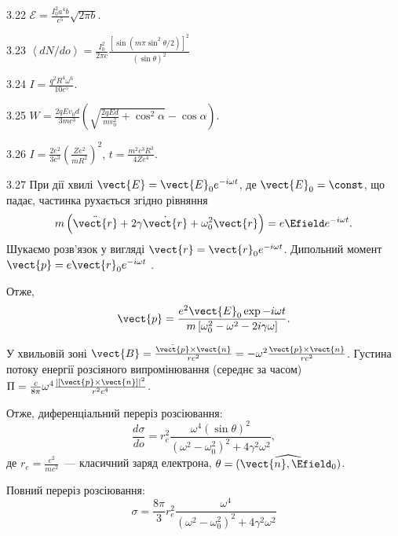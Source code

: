 \begin{Solution}{3.{22}}
	$\mathcal{E} = \frac{I_0^2a^4b}{c^5}\sqrt{2\pi b}$.
\end{Solution}
\begin{Solution}{3.{23}}
	$\left\langle {dN/do} \right\rangle  = \frac{I_0^2}{2\pi c}\frac{\left[\sin(m\pi \sin^2\theta/2) \right]^2}{(\sin\theta)^2}$
\end{Solution}
\begin{Solution}{3.{24}}
	$I = \frac{q^2R^4\omega^6}{10c^5} $.
\end{Solution}
\begin{Solution}{3.{25}}
	$W = \frac{2qEv_0d}{3mc^3}\left( \sqrt{\frac{2qEd}{mv_0^2}+\cos^2\alpha} - \cos\alpha\right) $.
\end{Solution}
\begin{Solution}{3.{26}}
	$I = \frac{2e^2}{3c^3} \left( \frac{Ze^2}{mR^2}\right)^2 $, $t = \frac{m^2c^3R^3}{4Ze^4}$.
\end{Solution}
\begin{Solution}{3.{27}}
	При дії хвилі $\vect{E} = \vect{E}_0e^{-i\omega t}$, де $\vect{E}_0 = \const$, що падає, частинка рухається згідно рівняння
	\[
		m \left( \ddot{\vect{r}} + 2\gamma\dot{\vect{r}} + \omega_0^2\vect{r}\right) = e\Efield e^{-i\omega t}.
	\]
	Шукаємо розв’язок у вигляді $\vect{r}  = \vect{r}_0e^{-i\omega t}$. Дипольний момент $\vect{p}  = e\vect{r}_0e^{-i\omega t}$ .

	Отже,
	\[
		\vect{p} = \frac{e^2\vect{E}_0\exp{- i\omega t}}{m\left[ {\omega _0^2 - \omega ^2 - 2i\gamma \omega } \right]}.
	\]

	У хвильовій зоні $\vect{B} = \frac{\ddot{\vect{p}} \times \vect{n}}{rc^2} =  - \omega^2 \frac{\vect{p} \times \vect{n}}{rc^2}$.
	Густина потоку енергії розсіяного випромінювання (середнє за часом) $\Pi  = \frac{c}{8\pi}{\omega ^4}\frac{{\left| {\left[ {{\vect{p}} \times {\vect{n}}} \right]} \right|}^2}{{{r^2}{c^4}}}$.

	Отже, диференціальний переріз розсіювання:
	\[\frac{{d\sigma }}{{do}} = r_e^2\frac{{{\omega ^4}{{(\sin \theta )}^2}}}{{{{({\omega ^2} - \omega _0^2)}^2} + 4{\gamma ^2}{\omega ^2}}},
	\]
	де $r_e = \frac{e^2}{mc^2}$~--- класичний заряд електрона, $\theta  = (\widehat{\vect{n},\Efield_0})$.

	Повний переріз розсіювання:
	\[
		\sigma  = \frac{{8\pi }}{3}r_e^2\frac{{{\omega ^4}}}{{{{({\omega ^2} - \omega _0^2)}^2} + 4{\gamma ^2}{\omega ^2}}}
	\]
\end{Solution}
